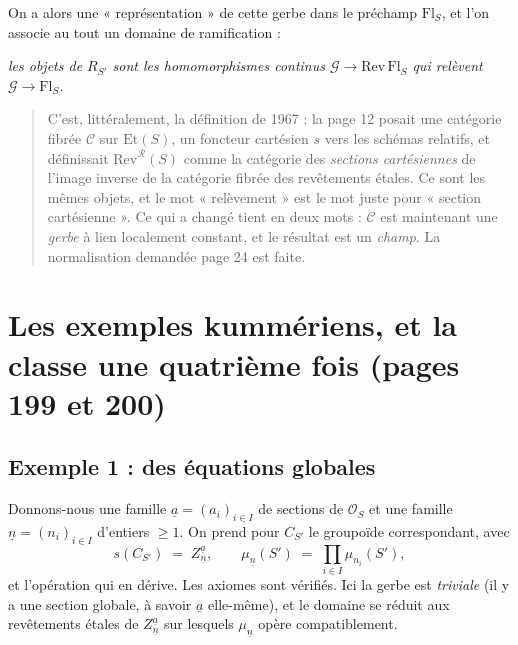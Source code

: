 \documentclass[11pt,a4paper]{article}
\begin{document}
On a alors une « représentation » de cette gerbe dans le préchamp
$\mathrm{Fl}_{S}$, et l'on associe au tout un domaine de ramification :


\emph{les objets de $R_{S'}$ sont les homomorphismes continus
$\mathcal{G} \to \mathrm{Rev}\,\mathrm{Fl}_{S}$ qui relèvent
$\mathcal{G} \to \mathrm{Fl}_{S}$.}

\begin{quote}
C'est, littéralement, la définition de 1967 : la page 12 posait une catégorie fibrée $\mathcal{C}$ sur $\mathrm{Et}(S)$, un foncteur cartésien $s$ vers les
schémas relatifs, et définissait $\mathrm{Rev}^{\mathcal{R}}(S)$ comme la
catégorie des \emph{sections cartésiennes} de l'image inverse de la catégorie
fibrée des revêtements étales. Ce sont les mêmes objets, et le mot
« relèvement » est le mot juste pour « section cartésienne ». Ce qui a changé
tient en deux mots : $\mathcal{C}$ est maintenant une \emph{gerbe} à lien
localement constant, et le résultat est un \emph{champ}. La normalisation
demandée page 24 est faite.
\end{quote}

\section*{Les exemples kummériens, et la classe une quatrième fois (pages 199 et 200)}

\subsection*{Exemple 1 : des équations globales}

Donnons-nous une famille $\underline{a} = (a_{i})_{i \in I}$ de sections de
$\mathcal{O}_{S}$ et une famille $\underline{n} = (n_{i})_{i \in I}$ d'entiers
$\geqslant 1$. On prend pour $C_{S'}$ le groupoïde correspondant, avec
\[
  s(C_{S'}) \;=\; Z^{\underline{a}}_{\underline{n}} , \qquad
  \mu_{\underline{n}}(S') \;=\; \prod_{i \in I} \mu_{n_{i}}(S') ,
\]
et l'opération qui en dérive. Les axiomes sont vérifiés. Ici la gerbe est
\emph{triviale} (il y a une section globale, à savoir $\underline{a}$
elle-même), et le domaine se réduit aux revêtements étales de
$Z^{\underline{a}}_{\underline{n}}$ sur lesquels $\mu_{\underline{n}}$ opère
compatiblement.
\end{document}
